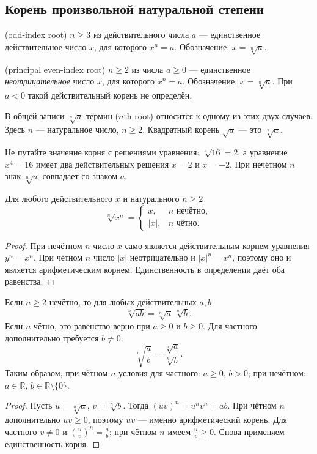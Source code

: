 \subsection*{Корень произвольной натуральной степени}
\begin{definition}
 (odd-index root) \(n\geq 3\) из действительного числа \(a\) — единственное действительное число \(x\), для которого \(x^n=a\). Обозначение: \(x=\sqrt[n]{a}\).
\end{definition}
\begin{definition}
 (principal even-index root) \(n\geq2\) из числа \(a\geq0\) — единственное \emph{неотрицательное} число \(x\), для которого \(x^n=a\). Обозначение: \(x=\sqrt[n]{a}\). При \(a<0\) такой действительный корень не определён.
\end{definition}
В общей записи \(\sqrt[n]{a}\) термин  (\(n\)th root) относится к одному из этих двух случаев. Здесь \(n\) — натуральное число, \(n\geq2\). Квадратный корень \(\sqrt a\) — это \(\sqrt[2]a\).

Не путайте значение корня с решениями уравнения: \(\sqrt[4]{16}=2\), а уравнение \(x^4=16\) имеет два действительных решения \(x=2\) и \(x=-2\). При нечётном \(n\) знак \(\sqrt[n]a\) совпадает со знаком \(a\).

\begin{theorem}
Для любого действительного \(x\) и натурального \(n\geq2\)
\[
\sqrt[n]{x^n}=
\begin{cases}
 x,&n\text{ нечётно},\\
 |x|,&n\text{ чётно}.
\end{cases}
\]
\end{theorem}
\begin{proof}
При нечётном \(n\) число \(x\) само является действительным корнем уравнения \(y^n=x^n\). При чётном \(n\) число \(|x|\) неотрицательно и \(|x|^n=x^n\), поэтому оно и является арифметическим корнем. Единственность в определении даёт оба равенства.
\end{proof}

\begin{theorem}
Если \(n\geq2\) нечётно, то для любых действительных \(a,b\)
\[
\sqrt[n]{ab}=\sqrt[n]a\,\sqrt[n]b.
\]
Если \(n\) чётно, это равенство верно при \(a\geq0\) и \(b\geq0\). Для частного дополнительно требуется \(b\neq0\):
\[
\sqrt[n]{\frac ab}=\frac{\sqrt[n]a}{\sqrt[n]b}.
\]
Таким образом, при чётном \(n\) условия для частного: \(a\geq0\), \(b>0\); при нечётном: \(a\in\mathbb R\), \(b\in\mathbb R\setminus\{0\}\).
\end{theorem}
\begin{proof}
Пусть \(u=\sqrt[n]a\), \(v=\sqrt[n]b\). Тогда \((uv)^n=u^nv^n=ab\). При чётном \(n\) дополнительно \(uv\geq0\), поэтому \(uv\) — именно арифметический корень. Для частного \(v\neq0\) и \((\frac uv)^n=\frac ab\); при чётном \(n\) имеем \(\frac uv\geq0\). Снова применяем единственность корня.
\end{proof}

